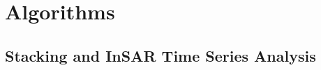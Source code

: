 
\section{Algorithms}



\subsection{Stacking and InSAR Time Series Analysis}
\label{sec:ch4-method-compare}

